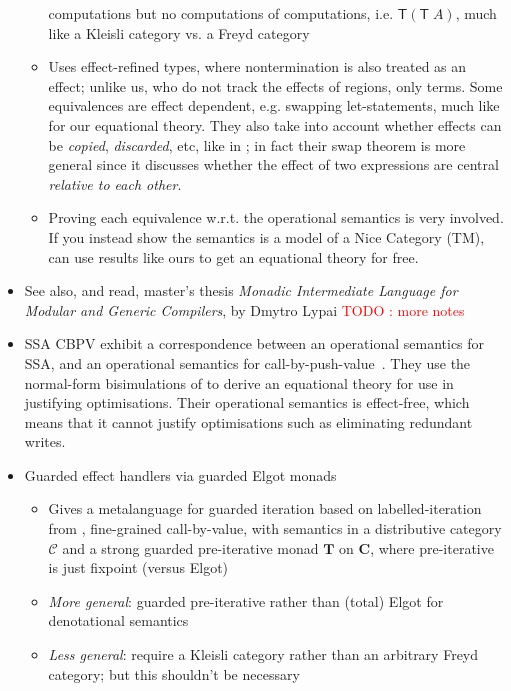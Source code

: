 \documentclass[acmsmall,screen,review]{acmart}
\newcounter{todos}
\newcommand{\todo}[1]{\stepcounter{todos} \textcolor{red}{TODO \arabic{todos}: #1}}
\newcommand{\mc}[1]{\ensuremath{\mathcal{#1}}}
\newcommand{\mb}[1]{\ensuremath{\mathbf{#1}}}
\newcommand{\ms}[1]{\ensuremath{\mathsf{#1}}}
\begin{document}
\begin{itemize}
\begin{itemize}
    computations but no computations of computations, i.e. $\ms{T}(\ms{T}\;A)$, much like a Kleisli
    category vs. a Freyd category
    \item Uses effect-refined types, where nontermination is also treated as an effect; unlike us,
    who do not track the effects of regions, only terms. Some equivalences are effect dependent,
    e.g. swapping let-statements, much like for our equational theory. They also take into account
    whether effects can be \emph{copied}, \emph{discarded}, etc, like in
    \citet{fuhrmann-direct-1999}; in fact their swap theorem is more general since it discusses
    whether the effect of two expressions are central \emph{relative to each other}.
    \item Proving each equivalence w.r.t. the operational semantics is very involved. If you instead
    show the semantics is a model of a Nice Category (TM), can use results like ours to get an
    equational theory for free.
  \end{itemize}
  \item See also, and read, master's thesis \textit{Monadic Intermediate Language for Modular and
  Generic Compilers}, by Dmytro Lypai \todo{more notes}
  \item SSA CBPV  \citet{garbuzov-structural-cfg-2018} exhibit a correspondence between an
    operational semantics for SSA, and an operational semantics for call-by-push-value~\cite{cbpv}.
    They use the normal-form bisimulations of \citet{lassen-bisim} to derive an equational theory
    for use in justifying optimisations. Their operational semantics is effect-free, which means
    that it cannot justify optimisations such as eliminating redundant writes.
  \item Guarded effect handlers via guarded Elgot monads \cite{goncharov-metalang-21}
  \begin{itemize}
    \item Gives a metalanguage for guarded iteration based on labelled-iteration from
    \citet{geron-iteration-16}, fine-grained call-by-value, with semantics in a distributive
    category $\mc{C}$ and a strong guarded pre-iterative monad $\mb{T}$ on $\mb{C}$, where
    pre-iterative is just fixpoint (versus Elgot)
    \item \emph{More general}: guarded pre-iterative rather than (total) Elgot for denotational
    semantics
    \item \emph{Less general}: require a Kleisli category rather than an arbitrary Freyd category;
    but this shouldn't be necessary

\end{itemize}
\end{itemize}
\end{document}
